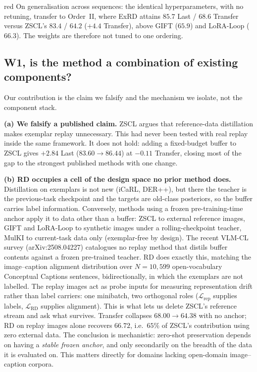 \documentclass[11pt]{article}
\begin{document}
\begin{color}{red}
On generalisation across sequences: the identical hyperparameters, with no retuning, transfer to Order~II, where ExRD attains $85.7$ Last / $68.6$ Transfer versus ZSCL's $83.4$ / $64.2$ ($+4.4$ Transfer), above GIFT ($65.9$) and LoRA-Loop ($66.3$). The weights are therefore not tuned to one ordering.

\subsection*{W1, is the method a combination of existing components?}

Our contribution is the claim we falsify and the mechanism we isolate, not the component stack.

\textbf{(a) We falsify a published claim.} ZSCL argues that reference-data distillation makes exemplar replay unnecessary. This had never been tested with real replay inside the same framework. It does not hold: adding a fixed-budget buffer to ZSCL gives $+2.84$ Last ($83.60\!\to\!86.44$) at $-0.11$ Transfer, closing most of the gap to the strongest published methods with one change.

\textbf{(b) RD occupies a cell of the design space no prior method does.} Distillation on exemplars is not new (iCaRL, DER++), but there the teacher is the previous-task checkpoint and the targets are old-class posteriors, so the buffer carries label information. Conversely, methods using a frozen pre-training-time anchor apply it to data other than a buffer: ZSCL to external reference images, GIFT and LoRA-Loop to synthetic images under a rolling-checkpoint teacher, MulKI to current-task data only (exemplar-free by design). The recent VLM-CL survey (arXiv:2508.04227) catalogues no replay method that distils buffer contents against a frozen pre-trained teacher. RD does exactly this, matching the image--caption alignment distribution over $N{=}10{,}599$ open-vocabulary Conceptual Captions sentences, bidirectionally, in which the exemplars are not labelled. The replay images act as probe inputs for measuring representation drift rather than label carriers: one minibatch, two orthogonal roles ($\mathcal{L}_\text{rep}$ supplies labels, $\mathcal{L}_\text{RD}$ supplies alignment). This is what lets us delete ZSCL's reference stream and ask what survives. Transfer collapses $68.00\!\to\!64.38$ with no anchor; RD on replay images alone recovers $66.72$, i.e.\ $65\%$ of ZSCL's contribution using zero external data. The conclusion is mechanistic: zero-shot preservation depends on having a \emph{stable frozen anchor}, and only secondarily on the breadth of the data it is evaluated on. This matters directly for domains lacking open-domain image--caption corpora.


\end{color}
\end{document}
